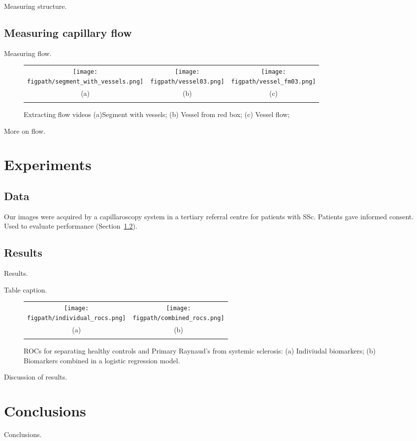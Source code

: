 \documentclass[runningheads,a4paper]{llncs}
\def\figpath{./figs}
\newcommand{\sref}[1]{Section~\ref{#1}}
\def\figpath{./figs}
\begin{document}
Measuring structure.

\subsection{Measuring capillary flow}
Measuring flow.
%
\begin{figure}[t]
\centering
\begin{tabular}{@{}c c c@{}}
\texttt{[image: \\figpath/segment\_with\_vessels.png]} &
\texttt{[image: \\figpath/vessel03.png]} &
\texttt{[image: \\figpath/vessel\_fm03.png]} \\
(a) & (b) & (c)\\
\noalign{\smallskip}
\end{tabular}
%
\caption{Extracting flow videos %
(a)Segment with vessels; %
(b) Vessel from red box; %
(c) Vessel flow; %
}
\label{f:vessel_flow}
\end{figure}
%
More on flow.
%
\section{Experiments}
\label{s:experiments}

\subsection{Data}
\label{s:data}
Our images were acquired by a capillaroscopy system in a tertiary referral centre for patients with SSc. Patients gave informed consent. Used to evaluate performance (\sref{s:results}).
%
\subsection{Results}
\label{s:results}
%
Results.
%
\newcommand{\specialcell}[2][c]{%
  \begin{tabular}[#1]{@{}l@{}}#2\end{tabular}}

\begin{table}[tb]
\centering

%
\caption{Table caption.}
\label{t:results}
\end{table}
%
\begin{figure}[t]
\centering
\begin{tabular}{@{}c c@{}}
\texttt{[image: \\figpath/individual\_rocs.png]} &
\texttt{[image: \\figpath/combined\_rocs.png]} \\
(a) & (b)\\
\noalign{\smallskip}
\end{tabular}
%
\caption{ROCs for separating healthy controls and Primary Raynaud's from systemic sclerosis: %
(a) Indiviudal biomarkers; %
(b) Biomarkers combined in a logistic regression model.
}
\label{f:subject_rocs}
\end{figure}
%
Discussion of results.
%
\section{Conclusions}
\label{s:conclusions}
Conclusions.




\end{document}
